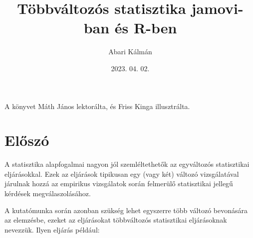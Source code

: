 \documentclass[
  letterpaper,
]{krantz}
\title{Többváltozós statisztika jamovi-ban és R-ben}
\author{Abari Kálmán}
\date{2023. 04. 02.}
\renewcommand*\contentsname{Tartalomjegyzék}
\newcommand\contentsname{Tartalomjegyzék}
\begin{document}
\maketitle

\thispagestyle{empty}

\begin{center}
A könyvet Máth János lektorálta, és Friss Kinga illusztrálta.
\end{center}

\setlength{\abovedisplayskip}{-5pt}
\setlength{\abovedisplayshortskip}{-5pt}


\ifdefined\Shaded\renewenvironment{Shaded}{\begin{tcolorbox}[boxrule=0pt, borderline west={3pt}{0pt}{shadecolor}, enhanced, sharp corners, breakable, frame hidden, interior hidden]}{\end{tcolorbox}}\fi

\renewcommand*\contentsname{Tartalomjegyzék}
{
\hypersetup{linkcolor=}
\setcounter{tocdepth}{2}
\tableofcontents
}
\listoffigures
\listoftables
{}

\hypertarget{sec-eloszo}{%
\chapter*{Előszó}\label{sec-eloszo}}


A statisztika alapfogalmai nagyon jól szemléltethetők az egyváltozós
statisztikai eljárásokkal. Ezek az eljárások tipikusan egy (vagy két)
változó vizsgálatával járulnak hozzá az empirikus vizsgálatok során
felmerülő statisztikai jellegű kérdések megválaszolásához.

A kutatómunka során azonban szükség lehet egyszerre több változó
bevonására az elemzésbe, ezeket az eljárásokat többváltozós statisztikai
eljárásoknak nevezzük. Ilyen eljárás például:
\end{document}
